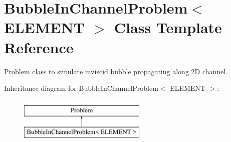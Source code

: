 \hypertarget{classBubbleInChannelProblem}{}\section{Bubble\+In\+Channel\+Problem$<$ E\+L\+E\+M\+E\+NT $>$ Class Template Reference}
\label{classBubbleInChannelProblem}


Problem class to simulate inviscid bubble propagating along 2D channel.  


Inheritance diagram for Bubble\+In\+Channel\+Problem$<$ E\+L\+E\+M\+E\+NT $>$\+:\begin{figure}[H]
\begin{center}
\leavevmode
\includegraphics[height=2.000000cm]{classBubbleInChannelProblem}
\end{center}
\end{figure}
